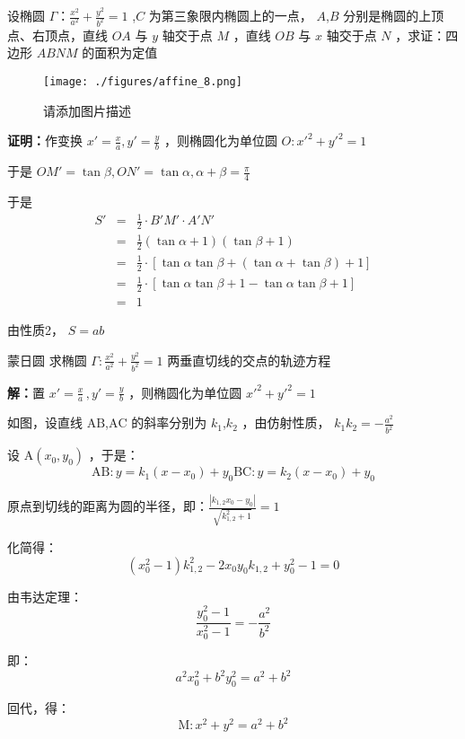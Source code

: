 \begin{corollary}{}
设椭圆 $\displaystyle{\Gamma：\frac{x^2}{a^2}+\frac{y^2}{b^2}=1}$ ,$\displaystyle{C}$ 为第三象限内椭圆上的一点， $\displaystyle{A}$,$\displaystyle{B}$ 分别是椭圆的上顶点、右顶点，直线 $\displaystyle{OA}$ 与 $\displaystyle{y}$ 轴交于点 $\displaystyle{M}$ ，直线 $\displaystyle{OB}$ 与 $\displaystyle{x}$ 轴交于点 $\displaystyle{N}$ ，求证：四边形 $\displaystyle{ABNM}$ 的面积为定值\begin{figure}[ht]
\centering
\texttt{[image: ./figures/affine\_8.png]}
\caption{请添加图片描述} \label{affine_fig8}
\end{figure}

\textbf{证明：}作变换 $\displaystyle{x'=\frac{x}{a},y'=\frac{y}{b}}$ ，则椭圆化为单位圆 $\displaystyle{O:x'^2+y'^2=1}$

于是 $\displaystyle{OM'=\tan{\beta},ON'=\tan{\alpha},\alpha+\beta=\frac{\pi}{4}}$ 

于是
$$\begin{eqnarray} S'&=&\frac{1}{2}\cdot B'M'\cdot A'N'\\ &=&\frac{1}{2}(\tan\alpha+1)(\tan\beta+1)\\ &=&\frac{1}{2}\cdot\left[\tan\alpha\tan\beta+(\tan\alpha+\tan\beta)+1\right]\\ &=&\frac{1}{2}\cdot[\tan\alpha\tan\beta+1-\tan\alpha\tan\beta+1]\\ &=&1 \end{eqnarray}$$

由性质2， $\displaystyle{S=ab}$ 
\end{corollary}
\begin{corollary}{蒙日圆}
求椭圆 $\displaystyle{\Gamma:\frac{x^2}{a^2}+\frac{y^2}{b^2}=1}$ 两垂直切线的交点的轨迹方程

\textbf{解：}置 $\displaystyle{x'=\frac{x}{a}\,,y'=\frac{y}b}$ ，则椭圆化为单位圆 $\displaystyle{x'^2+y'^2=1}$ 

如图，设直线 $\displaystyle{\text{AB}}$,$\displaystyle{\text{AC}}$ 的斜率分别为 $\displaystyle{k_1}$,$\displaystyle{k_2}$ ，由仿射性质， $\displaystyle{k_1k_2=-\frac{a^2}{b^2}}$ 

设 $\displaystyle{\text{A}(x_0,y_0)}$ ，于是： 
$$\text{AB}:y=k_1(x-x_0)+y_0\text{BC}:y=k_2(x-x_0)+y_0 $$

原点到切线的距离为圆的半径，即：$\displaystyle{\frac{|k_{1,2}x_0-y_0|}{\sqrt{k_{1,2}^2+1}}=1}$

化简得：
$$(x_0^2-1)k_{1,2}^2-2x_0y_0k_{1,2}+y_0^2-1=0$$

由韦达定理：
$$\frac{y_0^2-1}{x_0^2-1}=-\frac{a^2}{b^2}$$

即：
$$a^2x_0^2+b^2y_0^2=a^2+b^2$$

回代，得：
$$\text{M}:x^2+y^2=a^2+b^2$$
\end{corollary}
